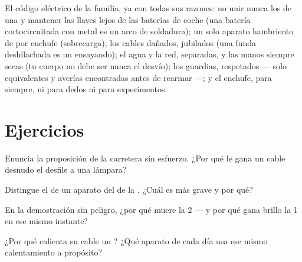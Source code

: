 \begin{remark}\label{rem:g7:short-circuits-safety:rules}
El código eléctrico de la familia, ya con todas sus razones: no unir
nunca los  de una  y mantener las llaves lejos de las
baterías de coche (una batería cortocircuitada con metal es un arco de
soldadura); un solo aparato hambriento de  por enchufe
(sobrecarga); los cables dañados, jubilados (una funda deshilachada es
un  ensayando); el agua y la red, separadas, y las
manos siempre secas (tu cuerpo no debe ser nunca el desvío); los
guardias, respetados --- solo  equivalentes y averías
encontradas antes de rearmar ---; y el enchufe, para siempre, ni para
dedos ni para experimentos.
\end{remark}

\section{Ejercicios}

\begin{exercise}[$\star$]\label{exo:g7:short-circuits-safety:1}
Enuncia la proposición de la carretera sin esfuerzo. ¿Por qué le gana
un cable desnudo el desfile a una lámpara?
\end{exercise}

\begin{exercise}[$\star$]\label{exo:g7:short-circuits-safety:2}
Distingue el  de un aparato del
 de la . ¿Cuál es más grave y por qué?
\end{exercise}

\begin{exercise}[$\star$]\label{exo:g7:short-circuits-safety:3}
En la demostración sin peligro, ¿por qué muere la  2 --- y
por qué gana brillo la  1 en ese mismo instante?
\end{exercise}

\begin{exercise}[$\star$]\label{exo:g7:short-circuits-safety:4}
¿Por qué calienta su cable un ? ¿Qué aparato de
cada día usa ese mismo calentamiento a propósito?
\end{exercise}

